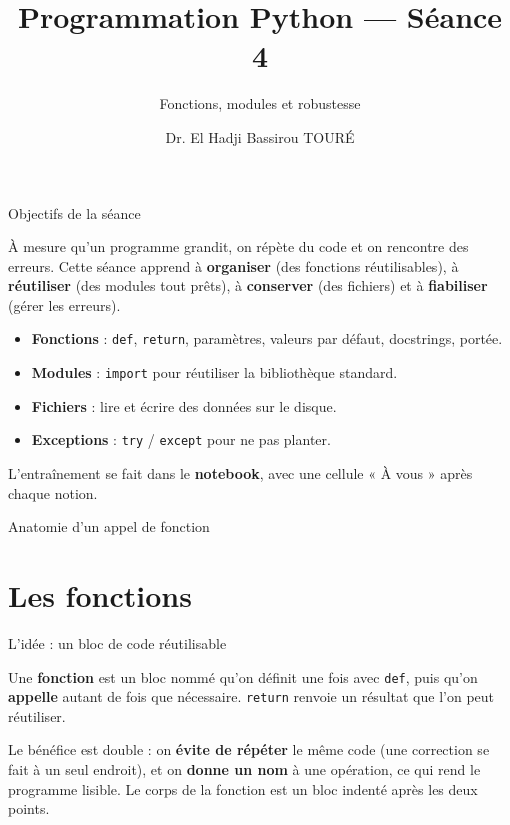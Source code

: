 \documentclass[aspectratio=169,11pt]{beamer}
\title{Programmation Python — Séance 4}
\subtitle{Fonctions, modules et robustesse}
\author{Dr. El Hadji Bassirou TOURÉ}
\institute{Département de Mathématiques et Informatique\\ Faculté des Sciences et Techniques\\ Université Cheikh Anta Diop de Dakar}
\date{}
\begin{document}
\begin{frame}\titlepage\end{frame}

\begin{frame}{Objectifs de la séance}
\begin{ucaddef}[Contenu]
{\small À mesure qu'un programme grandit, on répète du code et on rencontre des erreurs. Cette séance apprend à \textbf{organiser} (des fonctions réutilisables), à \textbf{réutiliser} (des modules tout prêts), à \textbf{conserver} (des fichiers) et à \textbf{fiabiliser} (gérer les erreurs).}
\end{ucaddef}
\begin{itemize}\small
  \item \textbf{Fonctions} : \texttt{def}, \texttt{return}, paramètres, valeurs par défaut, docstrings, portée.
  \item \textbf{Modules} : \texttt{import} pour réutiliser la bibliothèque standard.
  \item \textbf{Fichiers} : lire et écrire des données sur le disque.
  \item \textbf{Exceptions} : \texttt{try} / \texttt{except} pour ne pas planter.
\end{itemize}
{\small L'entraînement se fait dans le \textbf{notebook}, avec une cellule « À vous » après chaque notion.}
\end{frame}

\begin{frame}{Anatomie d'un appel de fonction}
\end{frame}

\section{Les fonctions}

\begin{frame}{L'idée : un bloc de code réutilisable}
\begin{ucaddef}
{\small Une \textbf{fonction} est un bloc nommé qu'on définit une fois avec \texttt{def}, puis qu'on \textbf{appelle} autant de fois que nécessaire. \texttt{return} renvoie un résultat que l'on peut réutiliser.}
\end{ucaddef}
{\small Le bénéfice est double : on \textbf{évite de répéter} le même code (une correction se fait à un seul endroit), et on \textbf{donne un nom} à une opération, ce qui rend le programme lisible. Le corps de la fonction est un bloc indenté après les deux points.}
\end{frame}
\end{document}

